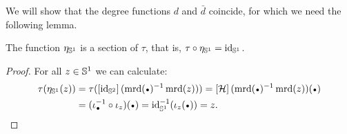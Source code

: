 \documentclass[english,a4paper]{lmcs}
\begin{document}
We will show that the degree functions $d$ and $\bar d$ coincide,
for which we need the following lemma.
\begin{lem}
The function $\eta_{{{\mathbb S^{1}}}}$ is a section of $\tau$, that is, $\tau\circ\eta_{{{\mathbb S^{1}}}} = \mathord{\mathrm{id}}_{{{\mathbb S^{1}}}}$.
\label{lem:eta-S1-section-tau}
\end{lem}
\begin{proof} For all $z\in{{\mathbb S^{1}}}$ we can calculate:
  \begin{align*}
    \tau(\eta_{\Sc}(z))
    &= \tau(\ap{\id_{\Sp}}(\inv{\mrd(\base)} \mrd(z)))
      = \ap{\hopf}(\inv{\mrd(\base)} \mrd(z))(\base) \\
    &= (\iota_{\base}^{-1} \circ \iota_z) (\base)
      = \id_{\Sc}^{-1}(\iota_z (\base)) = z.\qedhere
  \end{align*}
\end{proof}
\end{document}
